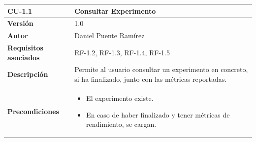 \begin{longtable}[H]{@{}ll@{}}
\toprule
\begin{minipage}[b]{0.23\columnwidth}\raggedright\strut
\textbf{CU-1.1}\strut
\end{minipage} & \begin{minipage}[b]{0.71\columnwidth}\raggedright\strut
\textbf{Consultar Experimento}\strut
\end{minipage}\tabularnewline
\midrule
\endhead
\begin{minipage}[t]{0.23\columnwidth}\raggedright\strut
\textbf{Versión}\strut
\end{minipage} & \begin{minipage}[t]{0.71\columnwidth}\raggedright\strut
1.0\strut
\end{minipage}\tabularnewline
\begin{minipage}[t]{0.23\columnwidth}\raggedright\strut
\textbf{Autor}\strut
\end{minipage} & \begin{minipage}[t]{0.71\columnwidth}\raggedright\strut
Daniel Puente Ramírez\strut
\end{minipage}\tabularnewline
\begin{minipage}[t]{0.23\columnwidth}\raggedright\strut
\textbf{Requisitos asociados}\strut
\end{minipage} & \begin{minipage}[t]{0.71\columnwidth}\raggedright\strut
RF-1.2, RF-1.3, RF-1.4, RF-1.5\strut
\end{minipage}\tabularnewline
\begin{minipage}[t]{0.23\columnwidth}\raggedright\strut
\textbf{Descripción}\strut
\end{minipage} & \begin{minipage}[t]{0.71\columnwidth}\raggedright\strut
Permite al usuario consultar un experimento en concreto, si ha finalizado, junto con las métricas reportadas.\strut
\end{minipage}\tabularnewline
\begin{minipage}[t]{0.23\columnwidth}\raggedright\strut
\textbf{Precondiciones}\strut
\end{minipage} & \begin{minipage}[t]{0.71\columnwidth}\raggedright\strut
\begin{itemize}
\tightlist
\item El experimento existe.
\item En caso de haber finalizado y tener métricas de rendimiento, se cargan.

\end{itemize}
\end{minipage}
\end{longtable}
